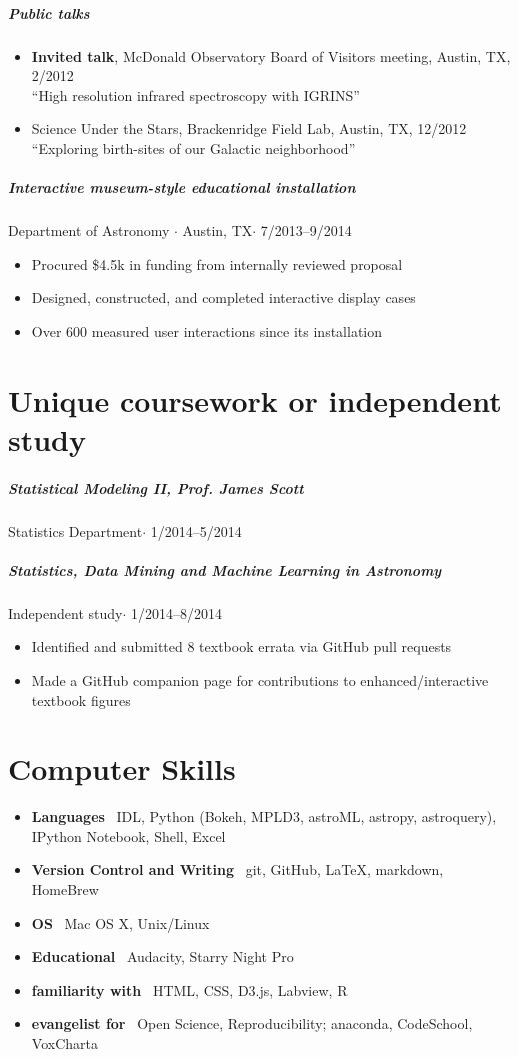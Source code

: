 \documentclass[10pt,letterpaper]{article}
\begin{document}
\subparagraph{Public talks}
	\begin{itemize}
	    \item \textbf{Invited talk}, McDonald Observatory Board of Visitors meeting, Austin, TX, 2/2012 \\
	    ``High resolution infrared spectroscopy with IGRINS'' 
	    \item Science Under the Stars, Brackenridge Field Lab, Austin, TX, 12/2012 \\
	    ``Exploring birth-sites of our Galactic neighborhood'' 
	\end{itemize}

\subparagraph{Interactive museum-style educational installation}
Department of Astronomy $\cdot$ Austin, TX$\cdot$ 7/2013--9/2014
	\begin{itemize}
	    \item Procured \$4.5k in funding from internally reviewed proposal
	    \item Designed, constructed, and completed interactive display cases
	    \item Over 600 measured user interactions since its installation
	\end{itemize}

\section*{Unique coursework or independent study}

\subparagraph{Statistical Modeling II, Prof. James Scott}
Statistics Department$\cdot$ 1/2014--5/2014

\subparagraph{Statistics, Data Mining and Machine Learning in Astronomy}
Independent study$\cdot$ 1/2014--8/2014
	\begin{itemize}
	    \item Identified and submitted 8 textbook errata via GitHub pull requests
	    \item Made a GitHub companion page for contributions to enhanced/interactive textbook figures
	\end{itemize}
	
\section*{Computer Skills}

\begin{itemize}
    \item \textbf{Languages} \ IDL, Python (Bokeh, MPLD3, astroML, astropy, astroquery), IPython Notebook, Shell, Excel
    \item \textbf{Version Control and Writing} \ git, GitHub, \LaTeX, markdown, HomeBrew
    \item \textbf{OS} \ Mac OS X, Unix/Linux
    \item \textbf{Educational} \ Audacity, Starry Night Pro
    \item \textbf{familiarity with} \ HTML, CSS, D3.js, Labview, R
    \item \textbf{evangelist for} \ Open Science, Reproducibility; anaconda, CodeSchool, VoxCharta
\end{itemize}
\end{document}
